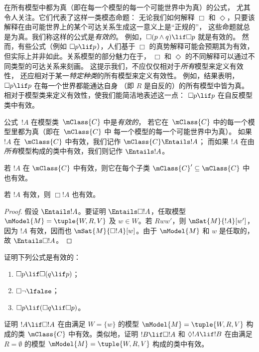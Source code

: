 \documentclass[../../../include/open-logic-section]{subfiles}
\begin{document}


\begin{explain}
  在所有模型中都为真（即在每一个模型的每一个可能世界中为真）的公式，
  尤其令人关注。它们代表了这样一类模态命题：
  无论我们如何解释 $\Box$ 和 $\Diamond$，只要该解释在由可能世界上的某个可达关系生成这一意义上是“正规的”，
  这些命题就总是为真。我们称这样的公式是\emph{有效的}。
  例如，$\Box(p \land q) \lif \Box p$ 就是有效的。
  然而，有些公式（例如 $\Box p \lif p$），人们基于 $\Box$ 的真势解释可能会预期其为有效，
  但实际上并非如此。关系模型的部分魅力在于，
  $\Box$ 和 $\Diamond$ 的不同解释可以通过不同类型的可达关系来刻画。
  这提示我们，不应仅仅相对于\emph{所有}模型来定义有效性，
  还应相对于某一\emph{特定种类}的所有模型来定义有效性。
  例如，结果表明，$\Box p \lif p$ 在每一个世界都能通达自身
  （即 $R$ 是自反的）的所有模型中皆为真。
  相对于模型类来定义有效性，使我们能简洁地表述这一点：
  $\Box p \lif p$ 在自反模型类中有效。
\end{explain}

\begin{defn}
  公式~$!A$ 在模型类~$\mClass{C}$ 中是\emph{有效的}，
  若它在~$\mClass{C}$ 中的每一个模型里都为真（即在~$\mClass{C}$ 中
  每一个模型的每一个可能世界中为真）。
  如果 $!A$ 在~$\mClass{C}$ 中有效，我们记作 $\mClass{C} \Entails !A$；
  而如果 $!A$ 在由\emph{所有}模型构成的类中有效，我们则记作 $\Entails !A$。
\end{defn}

\begin{prop}
  若 $!A$ 在 $\mClass{C}$ 中有效，则它在每个子类 $\mClass{C}' \subseteq \mClass{C}$ 中也有效。
\end{prop}

\begin{prop}
  若 $!A$ 有效，则 $\Box!A$ 也有效。
\end{prop}

\begin{proof}
  假设 $\Entails !A$。要证明 $\Entails \Box!A$，任取模型 $\mModel{M} =
  \tuple{W, R, V}$ 及 $w \in W$。若 $Rww'$，则 $\mSat{M}{!A}[w']$，因为 $!A$ 有效，因而也 $\mSat{M}{\Box!A}[w]$。由于 $\mModel{M}$ 和 $w$ 是任取的，故 $\Entails \Box!A$。
\end{proof}

\begin{prob}
  证明下列公式是有效的：
  \begin{enumerate}
  \item $\Box p \lif \Box (q \lif p)$；
  \item $\Box \lnot \lfalse$；
  \item $\Box p \lif (\Box q \lif \Box p)$。
  \end{enumerate}
\end{prob}

\begin{prob}
  证明 $!A \lif \Box!A$ 在由满足 $W = \{w\}$ 的模型 $\mModel{M} = \tuple{W, R, V}$ 构成的类 $\mClass{C}$ 中有效。类似地，证明 $!B \lif \Box !A$ 和 $\Diamond !A \lif !B$ 在由满足 $R = \emptyset$ 的模型 $\mModel{M} = \tuple{W, R, V}$ 构成的类中有效。
\end{prob}
\end{document}
